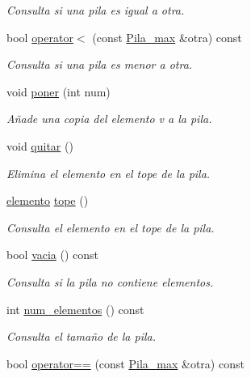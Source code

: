 \begin{DoxyCompactItemize}
\begin{DoxyCompactList}\small\item\em Consulta si una pila es igual a otra. \end{DoxyCompactList}\item 
bool \hyperlink{classPila__max_a95b52785eaa96cebe08b6b000953c1ac}{operator$<$} (const \hyperlink{classPila__max}{Pila\+\_\+max} \&otra) const
\begin{DoxyCompactList}\small\item\em Consulta si una pila es menor a otra. \end{DoxyCompactList}\item 
void \hyperlink{classPila__max_acb56642abe72ba171668295fe04202e1}{poner} (int num)
\begin{DoxyCompactList}\small\item\em Añade una copia del elemento v a la pila. \end{DoxyCompactList}\item 
\mbox{\label{classPila__max_ac4615eccf7d95bf4433e3da16c9aa2a2}} 
void \hyperlink{classPila__max_ac4615eccf7d95bf4433e3da16c9aa2a2}{quitar} ()
\begin{DoxyCompactList}\small\item\em Elimina el elemento en el tope de la pila. \end{DoxyCompactList}\item 
\hyperlink{structelemento}{elemento} \hyperlink{classPila__max_a14209c559be8250baeb0e3366e088462}{tope} ()
\begin{DoxyCompactList}\small\item\em Consulta el elemento en el tope de la pila. \end{DoxyCompactList}\item 
bool \hyperlink{classPila__max_a4b5784d89db4908b84a4ece46bc179fb}{vacia} () const
\begin{DoxyCompactList}\small\item\em Consulta si la pila no contiene elementos. \end{DoxyCompactList}\item 
int \hyperlink{classPila__max_a693ba4373cac8db4d820ff6c76d6d8da}{num\+\_\+elementos} () const
\begin{DoxyCompactList}\small\item\em Consulta el tamaño de la pila. \end{DoxyCompactList}\item 
bool \hyperlink{classPila__max_a8806f343ed75ecf695db7a307b6f65ed}{operator==} (const \hyperlink{classPila__max}{Pila\+\_\+max} \&otra) const

\end{DoxyCompactItemize}
